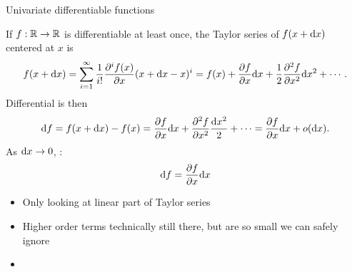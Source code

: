 \documentclass[8pt, aspectratio=149]{beamer}
\begin{document}
\begin{frame}{Univariate differentiable functions}

    If \( f: \mathbb{R} \to \mathbb{R} \) is differentiable at least once, the Taylor series of \( f(x + \mathrm{d} x) \) centered at \( x \) is 
    \begin{align*}
        f(x + \mathrm{d} x) 
        = \sum_{i = 1}^{\infty} \frac{1}{i!} \frac{\partial^i f(x)}{\partial x} (x + \mathrm{d} x - x)^i 
        = f(x) + \frac{\partial f}{\partial x} \mathrm{d} x + \frac{1}{2} \frac{\partial^2 f}{\partial x^2} \mathrm{d} x^2 + \cdots.
    \end{align*}
    Differential is then 
    \begin{align*}
        \mathrm{d} f 
        = f(x + \mathrm{d} x) - f(x) 
        = \frac{\partial f}{\partial x} \mathrm{d} x + \frac{\partial^2 f}{\partial x^2} \frac{\mathrm{d} x^2}{2} + \cdots
        = \frac{\partial f}{\partial x} \mathrm{d} x + o(\mathrm{d} x). 
    \end{align*}
    As \( \mathrm{d} x \to 0 \), : 
    \begin{align*}
        \mathrm{d} f 
        = \frac{\partial f}{\partial x} \mathrm{d} x
    \end{align*}
    \begin{itemize}
        \item Only looking at linear part of Taylor series 
        \item Higher order terms technically still there, but are so small we can safely ignore 
        \item {} 
    \end{itemize}

\end{frame}
\end{document}
